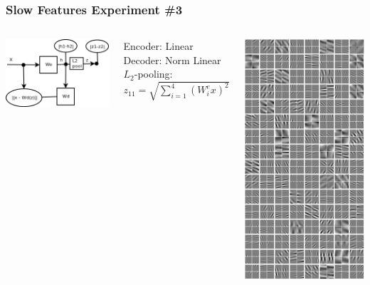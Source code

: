 \documentclass{beamer}
\begin{document}
\begin{frame}
\frametitle{Slow Features Experiment \#3}    
\begin{columns}[c]
    \column{4cm}
            \includegraphics[scale=0.3]{./figures/sfa4.png} 
            \vspace{0.1cm}
             \begin{tiny}
			 Encoder: Linear \\
			 Decoder: Norm Linear \\
			 $L_2$-pooling: $z_{11} = \sqrt{\sum_{i=1} ^4 (W^e_i x)^2}$
			\end{tiny}
    \column{4cm}
             \includegraphics[scale=0.3]{./figures/SF_pool_SF.png} 
\end{columns} 
\end{frame} 
\end{document}
